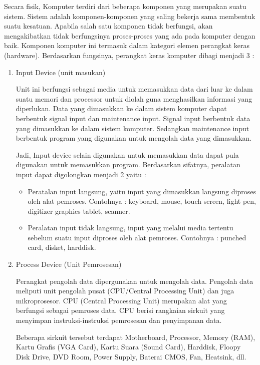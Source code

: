 Secara fisik, Komputer terdiri dari beberapa komponen yang merupakan suatu sistem. Sistem adalah komponen-komponen yang saling bekerja sama membentuk suatu kesatuan. Apabila salah satu komponen tidak berfungsi, akan mengakibatkan tidak berfungsinya proses-proses yang ada pada komputer dengan baik. Komponen komputer ini termasuk dalam kategori elemen perangkat keras (hardware). Berdasarkan fungsinya, perangkat keras komputer dibagi menjadi 3 :

\begin{enumerate}

\item Input Device (unit masukan)

Unit ini berfungsi sebagai media untuk memasukkan data dari luar ke dalam suatu memori dan processor untuk diolah guna menghasilkan informasi yang diperlukan. Data yang dimasukkan ke dalam sistem komputer dapat berbentuk signal input dan maintenance input. Signal input berbentuk data yang dimasukkan ke dalam sistem komputer. Sedangkan maintenance input berbentuk program yang digunakan untuk mengolah data yang dimasukkan.

Jadi, Input device selain digunakan untuk memasukkan data dapat pula digunakan untuk memasukkan program. Berdasarkan sifatnya, peralatan input dapat digolongkan menjadi 2 yaitu :

\begin{itemize}
\item Peratalan input langsung, yaitu input yang dimasukkan langsung diproses oleh alat pemroses. Contohnya : keyboard, mouse, touch screen, light pen, digitizer graphics tablet, scanner.

\item Peralatan input tidak langsung, input yang melalui media tertentu sebelum suatu input diproses oleh alat pemroses. Contohnya : punched card, disket, harddisk.
\end{itemize}

\item Process Device (Unit Pemrosesan)

Perangkat pengolah data dipergunakan untuk mengolah data. Pengolah data meliputi unit pengolah pusat (CPU/Central Processing Unit) dan juga mikroprosesor. CPU (Central Processing Unit) merupakan alat yang berfungsi sebagai pemroses data. CPU berisi rangkaian sirkuit yang menyimpan instruksi-instruksi pemrosesan dan penyimpanan data.

Beberapa sirkuit tersebut terdapat Motherboard, Processor, Memory (RAM), Kartu Grafis (VGA Card), Kartu Suara (Sound Card), Harddisk, Floopy Disk Drive, DVD Room, Power Supply, Baterai CMOS, Fan, Heatsink, dll. 


\end{enumerate}
